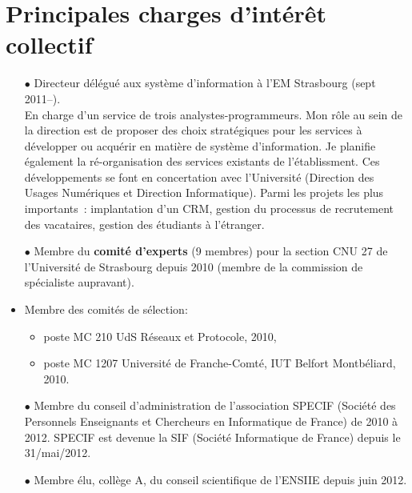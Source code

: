 \documentclass[11pt]{article}
\begin{document}
\section{Principales charges d'intérêt collectif}

\begin{itemize}
\item[$\bullet$] Directeur délégué aux système d'information à l'EM Strasbourg (sept 2011--).\\
En charge d'un service de trois analystes-programmeurs. Mon rôle au sein de la direction
est de proposer des choix stratégiques pour les services à développer ou acquérir en matière 
de système d'information. Je planifie également la ré-organisation des services existants de 
l'établissment. Ces développements se font en concertation avec l'Université (Direction des 
Usages Numériques et Direction Informatique). Parmi les projets les plus importants~: 
implantation d'un CRM, gestion du processus de recrutement des vacataires, gestion des
étudiants à l'étranger.\\
		
\item[$\bullet$] Membre du \textbf{comité d'experts} (9 membres) pour la section 
		CNU 27 de l'Université de Strasbourg depuis 2010 (membre de la commission
                de spécialiste aupravant).
	\item Membre des comités de sélection:
	\begin{itemize}
		\item poste MC 210 UdS Réseaux et Protocole, 2010,
		\item poste MC 1207 Université de Franche-Comté, IUT Belfort Montbéliard, 2010.\\
	\end{itemize}


\item[$\bullet$] 
Membre du conseil d'administration de l'association SPECIF (Société des Personnels Enseignants et Chercheurs 
en Informatique de France) de 2010 à 2012. SPECIF est devenue la SIF (Société Informatique de France) depuis le 31/mai/2012.\\

\item[$\bullet$] 
Membre élu, collège A, du conseil scientifique de l'ENSIIE depuis juin 2012. 
\vspace{1cm}
\end{itemize}


%
\end{document}

